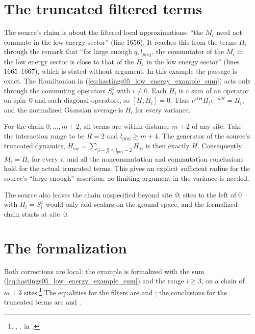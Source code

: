 \documentclass{article}
\begin{document}
\section{The truncated filtered terms}
The source's claim is about the filtered local approximations: ``the $M_i$ need
not commute in the low energy sector'' (line 1656). It reaches this from the
terms $H_i$ through the remark that ``for large enough $q,l_{proj}$, the
commutator of the $M_i$ in the low energy sector is close to that of the $H_i$
in the low energy sector'' (lines 1665--1667), which is stated without
argument. In this example the passage is exact. The Hamiltonian in
(\ref{eq:hastings05_low_energy_example_sum}) acts only through the commuting
operators $S^z_i$ with $i\ne0$. Each $H_i$ is a sum of an operator on spin~$0$
and such diagonal operators, so $[H,H_i]=0$. Thus
$e^{itH}H_ie^{-itH}=H_i$, and the normalized Gaussian average is $H_i$ for
every variance.

For the chain $0,\ldots,m+2$, all terms are within distance $m+2$ of any
site. Take the interaction range to be $R=2$ and
$l_{\mathrm{proj}}\ge m+4$. The generator of the source's truncated dynamics,
$H_{\mathrm{loc}}=\sum_{|i-j|\le l_{\mathrm{proj}}-2}H_j$, is then exactly $H$.
Consequently $M_i=H_i$ for every $i$, and all the noncommutation and
commutation conclusions hold for the actual truncated terms. This gives an
explicit sufficient radius for the source's ``large enough'' assertion;
no limiting argument in the variance is needed.

The source also leaves the chain unspecified beyond site~$0$; sites to the
left of $0$ with $H_i=S^z_i$ would only add scalars on the ground space,
and the formalized chain starts at site~$0$.

\section{The formalization}
Both corrections are local: the example is formalized with the sum
(\ref{eq:hastings05_low_energy_example_sum}) and the range $i\geq3$, on a chain
of $m+3$ sites.\footnote{,
    ,
    in .}
The equalities for the filters are
 and
; the conclusions for
the truncated terms are
 and
.



\end{document}
